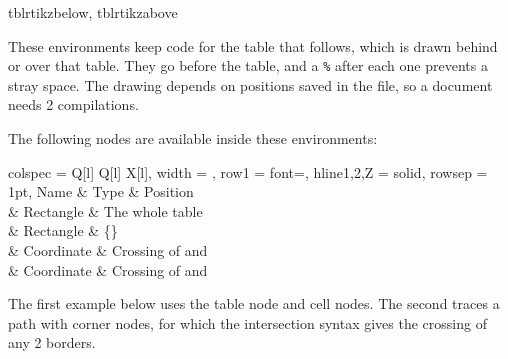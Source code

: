\begin{codedescribe}[
        env,
        new=2025A
    ]{tblrtikzbelow, tblrtikzabove}
    \begin{codesyntax}
          
          
    \end{codesyntax}
    These environments keep  code for the table that follows, which is drawn behind or over that table. They go before the table, and a \texttt{\%} after each one prevents a stray space. The drawing depends on positions saved in the  file, so a document needs 2 compilations.

    The following nodes are available inside these environments:
    \begin{center}
        \begin{tblr}{
            colspec = {Q[l] Q[l] X[l]},
            width = \linewidth,
            row{1} = {font=\bfseries},
            hline{1,2,Z} = {solid},
                    rowsep = 1pt,
                }
            Name                        & Type       & Position                                                \\
                             & Rectangle  & The whole table                                         \\
            \vrb{-} & Rectangle  & \{\}                          \\
                       & Coordinate & Crossing of  and  \\
                       & Coordinate & Crossing of  and 
        \end{tblr}
    \end{center}

    The first example below uses the table node and cell nodes. The second traces a path with corner nodes, for which the  intersection syntax  gives the crossing of any 2 borders.


\end{codedescribe}
